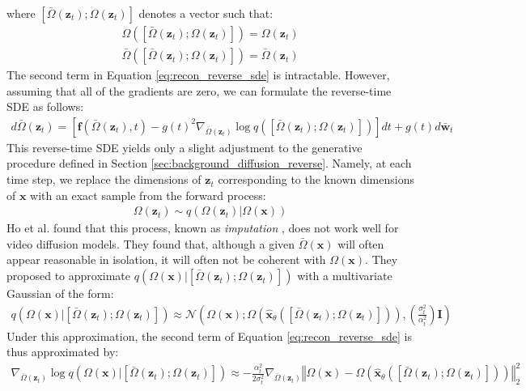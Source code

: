\documentclass[ oneside,%
                    author={George Herbert},
                    degree={MSci},
                     title={Video Diffusion Models for Climate Simulations},
                  subtitle={}]{dissertation}
\begin{document}
where $[\bar\Omega(\mathbf{z}_t); \Omega(\mathbf{z}_t)]$ denotes a vector such that:
\begin{align}
      \Omega([\bar\Omega(\mathbf{z}_t); \Omega(\mathbf{z}_t)]) = \Omega(\mathbf{z}_t)\\
      \bar\Omega([\bar\Omega(\mathbf{z}_t); \Omega(\mathbf{z}_t)]) = \bar\Omega(\mathbf{z}_t)
\end{align}
The second term in Equation \ref{eq:recon_reverse_sde} is intractable. However, assuming that all of the gradients are zero, we can formulate the reverse-time SDE as follows:
\begin{align}
      d\bar\Omega(\mathbf{z}_t)=\left[\mathbf{f}(\bar\Omega(\mathbf{z}_t), t) - g(t)^2\nabla_{\bar\Omega(\mathbf{z}_t)}\log q([\bar\Omega(\mathbf{z}_t); \Omega(\mathbf{z}_t)])\right]dt + g(t)d \bar{\mathbf{w}}_t
\end{align}
This reverse-time SDE yields only a slight adjustment to the generative procedure defined in Section \ref{sec:background_diffusion_reverse}. Namely, at each time step, we replace the dimensions of $\mathbf{z}_t$ corresponding to the known dimensions of $\mathbf{x}$ with an exact sample from the forward process:
\begin{align}
      \Omega(\mathbf{z}_t)\sim q(\Omega(\mathbf{z}_t)|\Omega(\mathbf{x}))
\end{align}
Ho et al. \cite{VDM_Ho} found that this process, known as \textit{imputation} \cite{Score_Based_Song}, does not work well for video diffusion models. They found that, although a given $\bar\Omega(\mathbf{x})$ will often appear reasonable in isolation, it will often not be coherent with $\Omega(\mathbf{x})$. They proposed to approximate $q(\Omega(\mathbf{x})|[\bar\Omega(\mathbf{z}_t); \Omega(\mathbf{z}_t)])$ with a multivariate Gaussian of the form:
\begin{align}
      q(\Omega(\mathbf{x})|[\bar\Omega(\mathbf{z}_t); \Omega(\mathbf{z}_t)]) \approx \mathcal{N}\left(\Omega(\mathbf{x}); \Omega\left(\hat{\mathbf{x}}_\theta\left([\bar\Omega(\mathbf{z}_t); \Omega(\mathbf{z}_t)]\right)\right), \left(\frac{\sigma_t^2}{\alpha_t^2}\right)\mathbf{I}\right)
\end{align}
Under this approximation, the second term of Equation \ref{eq:recon_reverse_sde} is thus approximated by:
\begin{align}
      \nabla_{\bar\Omega(\mathbf{z}_t)} \log q(\Omega(\mathbf{x})|[\bar\Omega(\mathbf{z}_t); \Omega(\mathbf{z}_t)])\approx-\frac{\alpha_t^2}{2\sigma_t^2}\nabla_{\bar\Omega(\mathbf{z}_t)} \left\Vert \Omega(\mathbf{x}) - \Omega\left(\hat{\mathbf{x}}_\theta\left([\bar\Omega(\mathbf{z}_t); \Omega(\mathbf{z}_t)]\right)\right)\right\Vert_2^2
\end{align}
\end{document}
